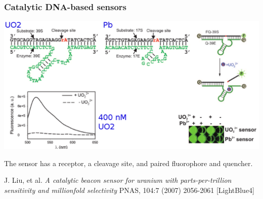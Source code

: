 \documentclass[10pt, xcolor=x11names, compress]{beamer}
\begin{document}
\begin{frame}
  \frametitle{Catalytic DNA-based sensors}

  \begin{center}
    \includegraphics[width=0.8\linewidth]{images/sensor.png}
  \end{center}

  \medskip

  The sensor has a {\color{Green4}receptor}, a {\color{red}cleavage
    site}, and paired fluorophore and quencher.

  \begin{bottomnote}[0.7][19.5]%
    J. Liu, et al. \textit{A catalytic beacon sensor for uranium
      with parts-per-trillion sensitivity and millionfold selectivity}
    PNAS, 104:7 (2007) 2056-2061
    [LightBlue4]
  \end{bottomnote}
\end{frame}
\end{document}
